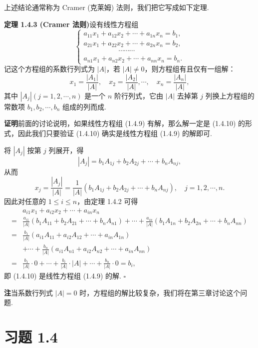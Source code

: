 \documentclass[UTF8,12pt,a4paper,fontset=fandol]{ctexart}
\begin{document}
上述结论通常称为 Cramer (克莱姆) 法则，我们把它写成如下定理.

\noindent\textbf{定理 1.4.3 (Cramer 法则)}\quad 设有线性方程组
\begin{equation}
\left\{
\begin{array}{l}
a_{11}x_1+a_{12}x_2+\cdots+a_{1n}x_n=b_1,\\
a_{21}x_1+a_{22}x_2+\cdots+a_{2n}x_n=b_2,\\
\hspace{5em}\cdots\cdots\cdots\\
a_{n1}x_1+a_{n2}x_2+\cdots+a_{nn}x_n=b_n.
\end{array}
\right.
\tag{1.4.9}
\end{equation}
记这个方程组的系数行列式为 $|A|$，若 $|A|\ne 0$，则方程组有且仅有一组解：
\begin{equation}
x_1=\frac{|A_1|}{|A|},\quad
x_2=\frac{|A_2|}{|A|},\cdots,\quad
x_n=\frac{|A_n|}{|A|},
\tag{1.4.10}
\end{equation}
其中 $|A_j|(j=1,2,\cdots,n)$ 是一个 $n$ 阶行列式，它由 $|A|$ 去掉第 $j$ 列换上方程组的常数项 $b_1,b_2,\cdots,b_n$ 组成的列而成.

\noindent\textbf{证明}\quad 前面的讨论说明，如果线性方程组 (1.4.9) 有解，那么解一定是 (1.4.10) 的形式，因此我们只要验证 (1.4.10) 确实是线性方程组 (1.4.9) 的解即可.

将 $|A_j|$ 按第 $j$ 列展开，得
\[
|A_j|=b_1A_{1j}+b_2A_{2j}+\cdots+b_nA_{nj},
\]
从而
\[
x_j=\frac{|A_j|}{|A|}
=\frac{1}{|A|}(b_1A_{1j}+b_2A_{2j}+\cdots+b_nA_{nj}),
\quad j=1,2,\cdots,n.
\]
因此对任意的 $1\le i\le n$，由定理 1.4.2 可得
\[
\begin{aligned}
&a_{i1}x_1+a_{i2}x_2+\cdots+a_{in}x_n\\
={}&
\frac{a_{i1}}{|A|}(b_1A_{11}+b_2A_{21}+\cdots+b_nA_{n1})
+\cdots+
\frac{a_{in}}{|A|}(b_1A_{1n}+b_2A_{2n}+\cdots+b_nA_{nn})\\
={}&
\frac{b_1}{|A|}(a_{i1}A_{11}+a_{i2}A_{12}+\cdots+a_{in}A_{1n})\\
&+\cdots+
\frac{b_n}{|A|}(a_{i1}A_{n1}+a_{i2}A_{n2}+\cdots+a_{in}A_{nn})\\
={}&
\frac{b_1}{|A|}\cdot 0+\cdots+\frac{b_i}{|A|}\cdot |A|
+\cdots+\frac{b_n}{|A|}\cdot 0=b_i,
\end{aligned}
\]
即 (1.4.10) 是线性方程组 (1.4.9) 的解. \(\square\)

\noindent\textbf{注}\quad 当系数行列式 $|A|=0$ 时，方程组的解比较复杂，我们将在第三章讨论这个问题.

\section*{习题 1.4}
\end{document}
